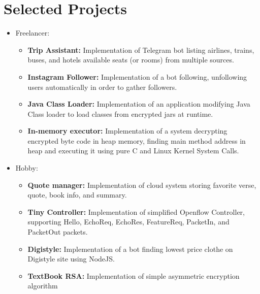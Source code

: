 \documentclass[a4paper,10pt]{article} %
\begin{document}
\color{blue}
\section{Selected Projects}
\color{Black}
\begin{itemize}
	\item \textcolor{blue(ryb)}{Freelancer}:
		\begin{itemize}
			\item 
				\textbf {Trip Assistant:} Implementation of Telegram bot listing airlines, trains, buses, and hotels available seats (or rooms) from multiple sources.
			\item
				\textbf {Instagram Follower:} Implementation of a bot following, unfollowing users automatically in order to gather followers.
			\item
				\textbf{Java Class Loader:} Implementation of an application modifying Java Class loader to load classes from encrypted jars at runtime.
			\item
				\textbf{In-memory executor:} Implementation of a system decrypting encrypted byte code in heap memory, finding main method address in heap and executing it using pure C and Linux Kernel System Calls. \\
			
		\end{itemize}
	
	\item \textcolor{blue(ryb)}{Hobby}:
		\begin{itemize}
			\item
			\textbf {Quote manager:} Implementation of cloud system storing favorite verse, quote, book info, and summary.
			
			\item 
				\textbf{Tiny Controller:} Implementation of simplified Openflow Controller, supporting Hello, EchoReq, EchoRes, FeatureReq, PacketIn, and PacketOut packets.
							
			\item 
				\textbf{Digistyle:} Implementation of a bot finding lowest price clothe on Digistyle site using NodeJS.
				
			\item 
				\textbf{TextBook RSA:} Implementation of simple asymmetric encryption algorithm\\
			
		\end{itemize}
	

\end{itemize}
\end{document}
